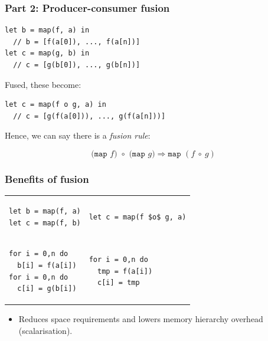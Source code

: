 \documentclass[rgb,dvipsnames]{beamer}
\begin{document}
\begin{frame}[fragile]
  \frametitle{Part 2: Producer-consumer fusion}

\begin{lstlisting}
let b = map(f, a) in
  // b = [f(a[0]), ..., f(a[n])]
let c = map(g, b) in
  // c = [g(b[0]), ..., g(b[n])]
\end{lstlisting}

Fused, these become:

\begin{lstlisting}
let c = map(f o g, a) in
  // c = [g(f(a[0])), ..., g(f(a[n]))]
\end{lstlisting}

Hence, we can say there is a \textit{fusion rule}:

\[
\texttt{(map~$f$)~$\circ$~(map~$g$)} \Rightarrow \texttt{map~$(f~\circ~g)$}
\]

\end{frame}

\begin{frame}[fragile]
  \frametitle{Benefits of fusion}

  \begin{tabular}{p{}|p{}}
\begin{lstlisting}
let b = map(f, a)
let c = map(f, b)
\end{lstlisting}
    &
\begin{lstlisting}[mathescape]
let c = map(f $o$ g, a)
\end{lstlisting}
\\
\begin{lstlisting}
for i = 0,n do
  b[i] = f(a[i])
for i = 0,n do
  c[i] = g(b[i])
\end{lstlisting}
&
\begin{lstlisting}
for i = 0,n do
  tmp = f(a[i])
  c[i] = tmp
\end{lstlisting}
\end{tabular}

  \begin{itemize}
  \item Reduces space requirements and lowers memory hierarchy
    overhead (scalarisation).
  \end{itemize}
\end{frame}
\end{document}
